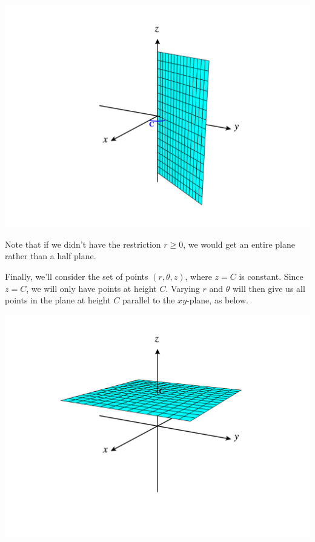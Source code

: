 \documentclass{ximera}
\begin{document}
\begin{image}
\includegraphics[width=\textwidth]{CalcPlot3D-theta_constant}
\end{image}

Note that if we didn't have the restriction $r\geq 0$, we would get an entire plane rather than a half plane.

Finally, we'll consider the set of points $(r,\theta, z)$, where $z = C$ is constant. Since $z = C$, we will only have points at height $C$. Varying $r$ and $\theta$ will then give us all points in the plane at height $C$ parallel to the $xy$-plane, as below.

\begin{image}
\includegraphics[width=\textwidth]{CalcPlot3D-z_constant}
\end{image}
\end{document}
